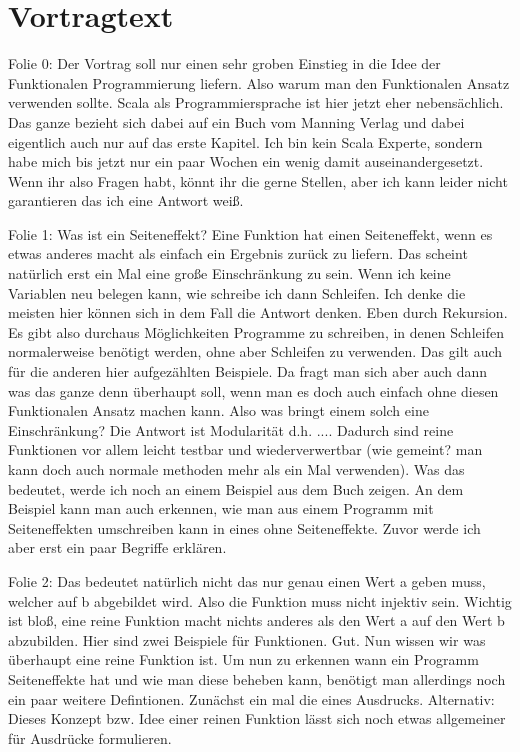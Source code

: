 \section[Section]{Vortragtext}
	\begin{frame}
	Folie 0: Der Vortrag soll nur einen sehr groben Einstieg in die Idee der Funktionalen Programmierung liefern. Also warum man den Funktionalen Ansatz verwenden sollte.  Scala als Programmiersprache ist hier jetzt eher nebensächlich. Das ganze bezieht sich dabei auf ein Buch vom Manning Verlag und dabei eigentlich auch nur auf das erste Kapitel. Ich bin kein Scala Experte, sondern habe mich bis jetzt nur ein paar Wochen ein wenig damit auseinandergesetzt. Wenn ihr also Fragen habt, könnt ihr die gerne Stellen, aber ich kann leider nicht garantieren das ich eine Antwort weiß. 
	
	Folie 1: Was ist ein Seiteneffekt? Eine Funktion hat einen Seiteneffekt, wenn es etwas anderes macht als einfach ein Ergebnis zurück zu liefern. Das scheint natürlich erst ein Mal eine große Einschränkung zu sein. Wenn ich keine Variablen neu belegen kann, wie schreibe ich
	dann Schleifen. Ich denke die meisten hier können sich in dem Fall die
	Antwort denken. Eben durch Rekursion. Es gibt also durchaus 	     Möglichkeiten Programme zu schreiben, in denen Schleifen normalerweise benötigt werden, ohne aber Schleifen zu verwenden. Das gilt auch für die anderen hier aufgezählten Beispiele. Da fragt man sich aber auch dann was das ganze denn überhaupt soll, wenn man es doch auch einfach ohne diesen Funktionalen Ansatz machen kann. Also was bringt einem solch eine Einschränkung? Die Antwort ist Modularität d.h. .... Dadurch sind reine Funktionen vor allem leicht testbar und wiederverwertbar (wie gemeint? man kann doch auch normale methoden mehr als ein Mal verwenden). Was das bedeutet, werde ich noch an einem Beispiel aus dem Buch zeigen. An dem Beispiel kann man auch erkennen, wie man aus einem Programm mit Seiteneffekten umschreiben kann in eines ohne Seiteneffekte. Zuvor werde ich aber erst ein paar Begriffe erklären.
	
	Folie 2: Das bedeutet natürlich nicht das nur genau einen Wert a geben muss, welcher auf b abgebildet wird. Also die Funktion muss nicht injektiv sein. Wichtig ist bloß, eine reine Funktion macht nichts anderes als den Wert a auf den Wert b abzubilden. Hier sind zwei Beispiele für Funktionen. Gut. Nun wissen wir was überhaupt eine reine Funktion ist. Um nun zu erkennen wann ein Programm Seiteneffekte hat und wie man diese beheben kann, benötigt man allerdings noch ein paar weitere Defintionen. Zunächst ein mal die eines Ausdrucks. Alternativ:
	Dieses Konzept bzw. Idee einer reinen Funktion lässt sich noch etwas allgemeiner für Ausdrücke formulieren. 
	

\end{frame}
